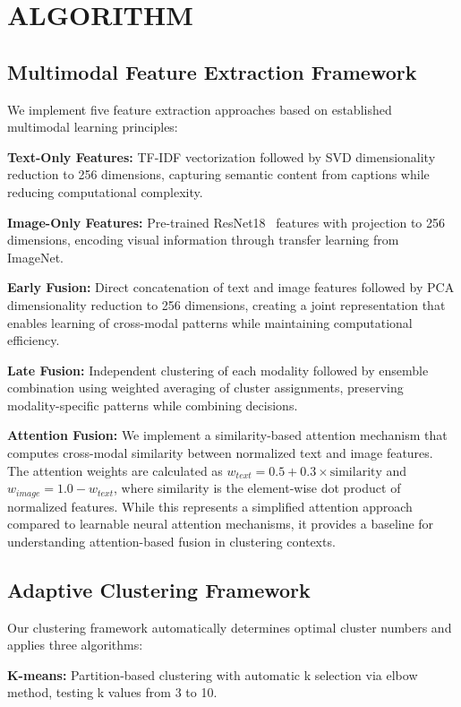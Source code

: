 \documentclass[sigconf]{acmart}
\begin{document}
\section{ALGORITHM}

\subsection{Multimodal Feature Extraction Framework}

We implement five feature extraction approaches based on established multimodal learning principles:

\textbf{Text-Only Features:} TF-IDF vectorization followed by SVD dimensionality reduction to 256 dimensions, capturing semantic content from captions while reducing computational complexity.

\textbf{Image-Only Features:} Pre-trained ResNet18~\cite{he2016deep} features with projection to 256 dimensions, encoding visual information through transfer learning from ImageNet.

\textbf{Early Fusion:} Direct concatenation of text and image features followed by PCA dimensionality reduction to 256 dimensions, creating a joint representation that enables learning of cross-modal patterns while maintaining computational efficiency.

\textbf{Late Fusion:} Independent clustering of each modality followed by ensemble combination using weighted averaging of cluster assignments, preserving modality-specific patterns while combining decisions.

\textbf{Attention Fusion:} We implement a similarity-based attention mechanism that computes cross-modal similarity between normalized text and image features. The attention weights are calculated as $w_{text} = 0.5 + 0.3 \times \text{similarity}$ and $w_{image} = 1.0 - w_{text}$, where similarity is the element-wise dot product of normalized features. While this represents a simplified attention approach compared to learnable neural attention mechanisms, it provides a baseline for understanding attention-based fusion in clustering contexts.

\subsection{Adaptive Clustering Framework}

Our clustering framework automatically determines optimal cluster numbers and applies three algorithms:

\textbf{K-means:} Partition-based clustering with automatic k selection via elbow method, testing k values from 3 to 10.
\end{document}
